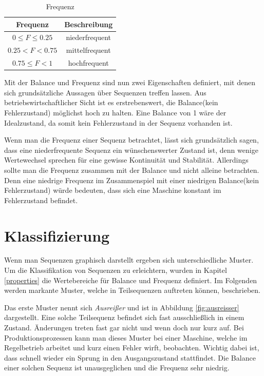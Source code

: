 \begin{table}[H]
	\begin{center}
		\begin{tabular}{|c c|} 
			\hline
			Frequenz & Beschreibung \\
			\hline\hline
			$0 \leq F \leq 0.25$ & niederfrequent \\ 
			\hline
			$0.25 < F < 0.75$ & mittelfrequent \\
			\hline
			$0.75 \leq F < 1$ & hochfrequent \\
			\hline
		\end{tabular}
		\caption{Frequenz}
		\label{tab:frequence}
	\end{center}
\end{table}

Mit der Balance und Frequenz sind nun zwei Eigenschaften definiert, mit denen sich grundsätzliche Aussagen über Sequenzen treffen lassen. Aus betriebswirtschaftlicher Sicht ist es erstrebenswert, die Balance(kein Fehlerzustand) möglichst hoch zu halten. Eine Balance von 1 wäre der Idealzustand, da somit kein Fehlerzustand in der Sequenz vorhanden ist. 

Wenn man die Frequenz einer Sequenz betrachtet, lässt sich grundsätzlich sagen, dass eine niederfrequente Sequenz ein wünschenswerter Zustand ist, denn wenige Wertewechsel sprechen für eine gewisse Kontinuität und Stabilität. Allerdings sollte man die Frequenz zusammen mit der Balance und nicht alleine betrachten. Denn eine niedrige Frequenz im Zusammenspiel mit einer niedrigen Balance(kein Fehlerzustand) würde bedeuten, dass sich eine Maschine konstant im Fehlerzustand befindet.

\section{Klassifizierung}
Wenn man Sequenzen graphisch darstellt ergeben sich unterschiedliche Muster. Um die Klassifikation von Sequenzen zu erleichtern, wurden in Kapitel \ref{properties} die Wertebereiche für Balance und Frequenz definiert. Im Folgenden werden markante Muster, welche in Teilsequenzen auftreten können, beschrieben.

Das erste Muster nennt sich \textit{Ausreißer} und ist in Abbildung \ref{fig:ausreisser} dargestellt. Eine solche Teilsequenz befindet sich fast ausschließlich in einem Zustand. Änderungen treten fast gar nicht und wenn doch nur kurz auf. Bei Produktionsprozessen kann man dieses Muster bei einer Maschine, welche im Regelbetrieb arbeitet und kurz einen Fehler wirft, beobachten. Wichtig dabei ist, dass schnell wieder ein Sprung in den Ausgangszustand stattfindet. Die Balance einer solchen Sequenz ist unausgeglichen und die Frequenz sehr niedrig.

